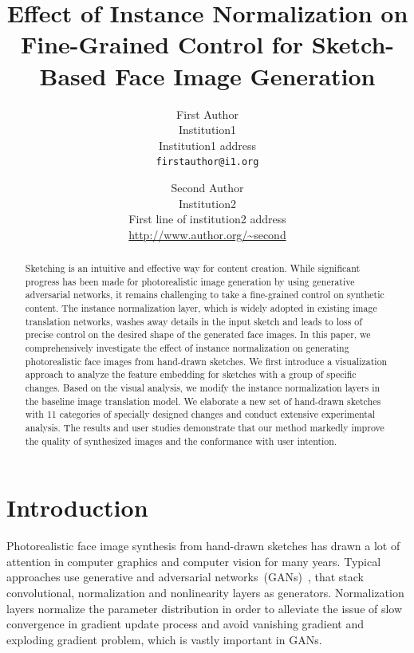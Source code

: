\documentclass[10pt,twocolumn,letterpaper]{article}
\begin{document}
\title{Effect of Instance Normalization on Fine-Grained Control for Sketch-Based Face Image Generation}

\author{First Author\\
Institution1\\
Institution1 address\\
{\tt\small firstauthor@i1.org}
\and
Second Author\\
Institution2\\
First line of institution2 address\\
{\small\url{http://www.author.org/~second}}
}

\maketitle

\begin{abstract}
	Sketching is an intuitive and effective way for content creation. While significant progress has been made for photorealistic image generation by using generative adversarial networks, it remains challenging to take a fine-grained control on synthetic content.  
	The instance normalization layer, which is widely adopted in existing image translation networks, washes away details in the input sketch and leads to loss of precise control on the desired shape of the generated face images.
	In this paper, we comprehensively investigate the effect of instance normalization on generating photorealistic face images from hand-drawn sketches.
	We first introduce a visualization approach to analyze the feature embedding for sketches with a group of specific changes.  
	Based on the visual analysis, we modify the instance normalization layers in the baseline image translation model. 
	We elaborate a new set of hand-drawn sketches with 11 categories of specially designed changes and conduct extensive experimental analysis.  
	The results and user studies demonstrate that our method markedly improve the quality of synthesized images and the conformance with user intention.    
\end{abstract}

\section{Introduction}
Photorealistic face image synthesis from hand-drawn sketches has drawn a lot of attention in computer graphics and computer vision for many years. Typical approaches use generative and adversarial networks~(GANs)~\cite{gan}, that  stack convolutional, normalization and nonlinearity layers as generators. Normalization layers normalize the parameter distribution in order to alleviate the issue of slow convergence in gradient update process and avoid vanishing gradient and exploding gradient problem, which is vastly important in GANs.
\end{document}
